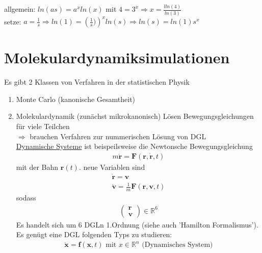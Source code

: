 \documentclass[12pt]{article}
\begin{document}
allgemein: $ln(as)= a^x ln(x)$ mit $4=3^x \Rightarrow x= \frac{lln(4)}{ln(3)}$ \\
setze: $a= \frac{1}{s} \Rightarrow ln(1)= \left( \frac{1}{s}) \right)^x ln(s) \Rightarrow ln(s)= ln(1) s^x$

\section{Molekulardynamiksimulationen}
Es gibt 2 Klassen von Verfahren in der statistischen Physik 
\begin{enumerate}
\item Monte Carlo (kanonische Gesamtheit)
\item Molekulardynamik (zunächst mikrokanonisch)
Lösen Bewegungsgleichungen für viele Teilchen \\
$\Rightarrow$ brauchen Verfahren zur nummerischen Lösung von DGL \\
\underline{Dynamische Systeme} ist beispeilsweise die Newtonsche Bewegungsgleichung \begin{align}
m \ddot{\textbf{r}} = \mathbf{F} (\mathbf{r}, \dot{\mathbf{r}}, t)
\end{align} mit der Bahn $\mathbf{r}(t)$.
neue Variablen sind \begin{align*}
\dot{\mathbf{r}}= \mathbf{v} \\
\dot{\mathbf{v}} = \frac{1}{m} \mathbf{F}(\mathbf{r}, \mathbf{v},t) 
\end{align*}
sodass 
\begin{align*}
\begin{pmatrix}\mathbf{r}\\ \mathbf{v}\end{pmatrix} \in \mathbb{R}^6
\end{align*}
Es handelt sich um 6 DGLn 1.Ordnung (siehe auch 'Hamilton Formalismus'). Es genügt eine DGL folgenden Typs zu studieren: 
\begin{align}
\dot{\mathbf{x}}= \mathbf{f}( \mathbf{x},t) \mbox{  mit  } x \in \mathbb{R}^n \mbox{   (Dynamisches System)}
\end{align}

\end{enumerate}
\end{document}
